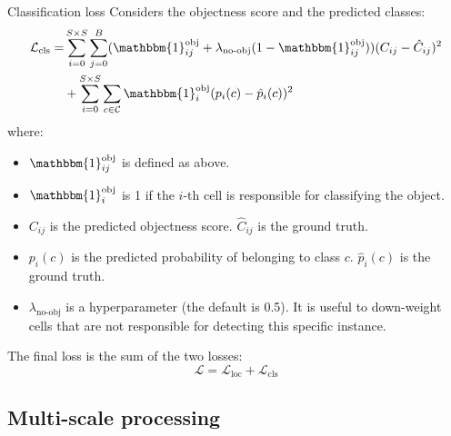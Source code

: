 \begin{description}
\begin{descriptionlist}
            \item[Classification loss] 
                Considers the objectness score and the predicted classes:
                \[
                    \begin{split}
                        \mathcal{L}_\text{cls} = &\sum_{i=0}^{S \times S} \sum_{j=0}^{B} (\mathbbm{1}_{ij}^\text{obj} + \lambda_\text{no-obj}(1-\mathbbm{1}_{ij}^\text{obj}))(C_{ij} - \hat{C}_{ij})^2 \\
                            &+ \sum_{i=0}^{S \times S} \sum_{c \in \mathcal{C}} \mathbbm{1}_{i}^\text{obj} (p_i(c) - \hat{p}_i(c))^2
                    \end{split}
                \]
                where:
                \begin{itemize}
                    \item $\mathbbm{1}_{ij}^\text{obj}$ is defined as above.
                    \item $\mathbbm{1}_{i}^\text{obj}$ is 1 if the $i$-th cell is responsible for classifying the object.
                    \item $C_{ij}$ is the predicted objectness score. $\hat{C}_{ij}$ is the ground truth.
                    \item $p_i(c)$ is the predicted probability of belonging to class $c$. $\hat{p}_i(c)$ is the ground truth.
                    \item $\lambda_\text{no-obj}$ is a hyperparameter (the default is 0.5). 
                        It is useful to down-weight cells that are not responsible for detecting this specific instance.
                \end{itemize}
        \end{descriptionlist}

        The final loss is the sum of the two losses:
        \[\mathcal{L} = \mathcal{L}_\text{loc} + \mathcal{L}_\text{cls} \]
\end{description}


\subsection{Multi-scale processing}

